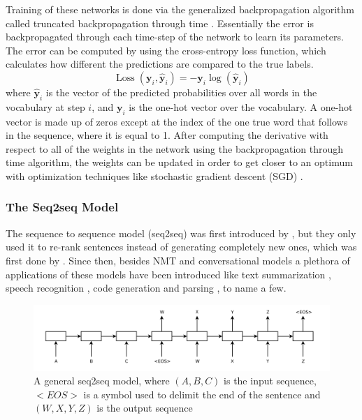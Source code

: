 \documentclass[12pt]{article}
\DeclareMathOperator{\Loss}{Loss}
\begin{document}
Training of these networks is done via the generalized backpropagation algorithm called truncated backpropagation through time \cite{Werbos:1990,RNN:1988}. Essentially the error is backpropagated through each time-step of the network to learn its parameters. The error can be computed by using the cross-entropy loss function, which calculates how different the predictions are compared to the true labels.
\begin{equation} \label{eq231c}
\Loss(\bm{y}_i,\bm{\hat{y}}_{i})=-\bm{y}_i \log(\bm{\hat{y}}_{i})
\end{equation}
where \(\bm{\hat{y}}_{i}\) is the vector of the predicted probabilities over all words in the vocabulary at step \(i\), and \(\bm{y}_i\) is the one-hot vector over the vocabulary. A one-hot vector is made up of zeros except at the index of the one true word that follows in the sequence, where it is equal to 1. After computing the derivative with respect to all of the weights in the network using the backpropagation through time algorithm, the weights can be updated in order to get closer to an optimum with optimization techniques like stochastic gradient descent (SGD) \cite{SGD:2010}. 

\subsubsection{The Seq2seq Model} \label{sssec:232}
The sequence to sequence model (seq2seq) was first introduced by \cite{Cho:2014}, but they only used it to re-rank sentences instead of generating completely new ones, which was first done by \cite{Sutskever:2014}. Since then, besides NMT and conversational models a plethora of applications of these models have been introduced like text summarization \cite{Nallapati:2016}, speech recognition \cite{Chiu:2017}, code generation \cite{Rico:2017} and parsing \cite{Konstas:2017}, to name a few.

\begin{figure}[H]
	\centering
	\includegraphics[width=1.0\textwidth]{pics/seq2seq.png}
	\caption{A general seq2seq model, where \((A,B,C)\) is the input sequence, \(<EOS>\) is a symbol used to delimit the end of the sentence and \((W,X,Y,Z)\) is the output sequence \cite{Sutskever:2014}}
	\label{fig:232a}
\end{figure}
\end{document}
